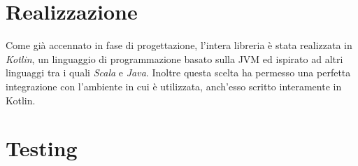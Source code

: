 \section{Realizzazione}

	
	Come già accennato in fase di progettazione, l'intera libreria è stata realizzata in \textit{Kotlin}, un linguaggio di programmazione basato sulla JVM ed ispirato ad altri linguaggi tra i quali \textit{Scala} e \textit{Java}. Inoltre questa scelta ha permesso una perfetta integrazione con l'ambiente in cui è utilizzata, anch'esso scritto interamente in Kotlin.

\section{Testing}





%
%	
%	
%		
%	
